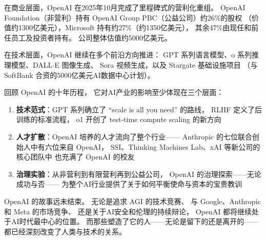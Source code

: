 在商业层面，OpenAI 在2025年10月完成了里程碑式的营利化重组。
OpenAI Foundation（非营利）持有 OpenAI Group PBC（公益公司）约26\%的股权
（价值约1300亿美元），Microsoft 持有约27\%（约1350亿美元），
其余47\%由现任和前任员工及投资者持有。
公司整体估值约5000亿美元。

在技术层面，OpenAI 继续在多个前沿方向推进：
GPT 系列语言模型、o 系列推理模型、DALL$\cdot$E 图像生成、
Sora 视频生成，以及 Stargate 基础设施项目
（与 SoftBank 合资的5000亿美元AI数据中心计划）。

\begin{whybox}
回顾 OpenAI 的十年历程，
它对AI产业的影响至少体现在三个层面：

\begin{enumerate}[noitemsep]
  \item \textbf{技术范式}：GPT 系列确立了 ``scale is all you need'' 的路线，
        RLHF 定义了后训练的标准流程，
        o1 开创了 test-time compute scaling 的新方向
  \item \textbf{人才扩散}：OpenAI 培养的人才流向了整个行业——
        Anthropic 的七位联合创始人中有六位来自 OpenAI，
        SSI、Thinking Machines Lab、xAI 等新公司的核心团队中
        也充满了 OpenAI 的校友
  \item \textbf{治理实验}：从非营利到有限营利再到公益公司，
        OpenAI 的治理探索——无论成功与否——
        为整个AI行业提供了关于如何平衡使命与资本的宝贵教训
\end{enumerate}
\end{whybox}

OpenAI 的故事远未结束。
无论是追求 AGI 的技术竞赛、
与 Google、Anthropic 和 Meta 的市场竞争、
还是关于AI安全和伦理的持续辩论，
OpenAI 都将继续处于AI时代最中心的位置。
而那些塑造了它的人——无论是留下的还是离开的——
都已经深刻改变了人类与技术的关系。
